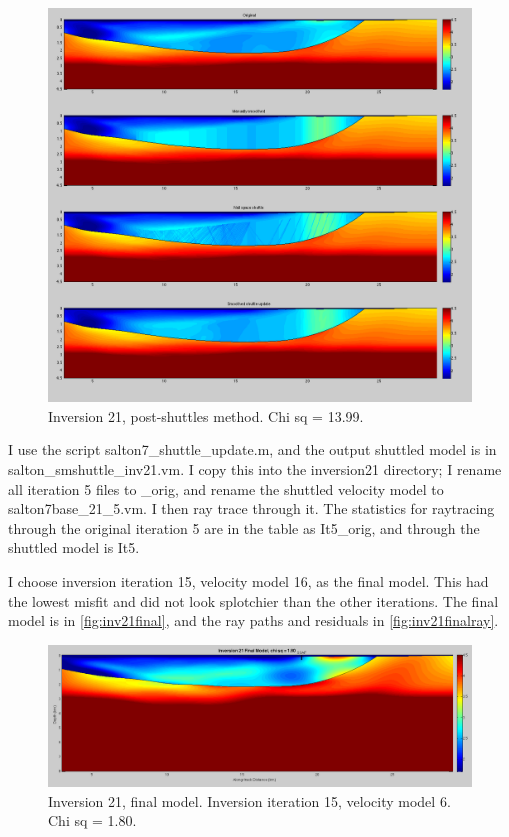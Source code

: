 \documentclass[fontsize=11pt, %
                             paper=a4, %
                             twoside, %
                             captions=tableheading,
                             index=totoc,
                             hyperref]{labbook}
\begin{document}
\begin{addmargin}[4cm]{0cm}
\begin{figure}[h!]
\raggedleft
\includegraphics[scale=0.3,keepaspectratio=true]{figs/inv21_postshut.png}
\caption{Inversion 21, post-shuttles method.  Chi sq = 13.99.}
\label{fig:inv21postshut}
\end{figure} 

I use the script salton7\_shuttle\_update.m, and the output shuttled model is in salton\_smshuttle\_inv21.vm.  I copy this into the inversion21 directory; I rename all iteration 5 files to \_orig, and rename the shuttled velocity model to salton7base\_21\_5.vm.  I then ray trace through it.  The statistics for raytracing through the original iteration 5 are in the table as It5\_orig, and through the shuttled model is It5.  


I choose inversion iteration 15, velocity model 16, as the final model.  This had the lowest misfit and did not look splotchier than the other iterations.  The final model is in \autoref{fig:inv21final}, and the ray paths and residuals in \autoref{fig:inv21finalray}.

\begin{figure}[h!]
\raggedleft
\includegraphics[scale=0.3,keepaspectratio=true]{figs/inv21final.png}
\caption{Inversion 21, final model.  Inversion iteration 15, velocity model 6.  Chi sq = 1.80.}
\label{fig:inv21final}
\end{figure} 


\end{addmargin}
\end{document}
